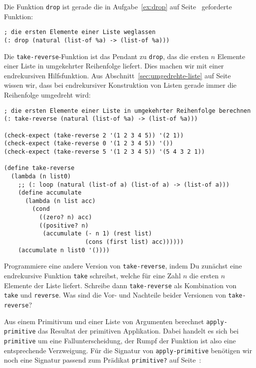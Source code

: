 %
Die Funktion \lstinline{drop} ist gerade die in
Aufgabe~\ref{ex:drop} auf Seite~\pageref{ex:drop} geforderte Funktion:
%
\begin{lstlisting}
; die ersten Elemente einer Liste weglassen
(: drop (natural (list-of %a) -> (list-of %a)))
\end{lstlisting}
%
Die \lstinline{take-reverse}-Funktion ist das Pendant zu
\lstinline{drop}, das die ersten $n$ Elemente einer Liste in
umgekehrter Reihenfolge liefert.  Dies machen wir mit einer
endrekursiven Hilfsfunktion.  Aus Abschnitt~\ref{sec:umgedrehte-liste}
auf Seite~\pageref{sec:umgedrehte-liste} wissen wir, dass bei
endrekursiver Konstruktion von Listen gerade immer die Reihenfolge
umgedreht wird:
%
\begin{lstlisting}
; die ersten Elemente einer Liste in umgekehrter Reihenfolge berechnen
(: take-reverse (natural (list-of %a) -> (list-of %a)))

(check-expect (take-reverse 2 '(1 2 3 4 5)) '(2 1))
(check-expect (take-reverse 0 '(1 2 3 4 5)) '())
(check-expect (take-reverse 5 '(1 2 3 4 5)) '(5 4 3 2 1))

(define take-reverse
  (lambda (n list0)
    ;; (: loop (natural (list-of a) (list-of a) -> (list-of a)))
    (define accumulate
      (lambda (n list acc)
        (cond
          ((zero? n) acc)
          ((positive? n)
           (accumulate (- n 1) (rest list)
                       (cons (first list) acc))))))
    (accumulate n list0 '())))
\end{lstlisting}
%
\begin{aufgabeinline}
  Programmiere eine andere Version von \lstinline{take-reverse}, indem
  Du zunächst eine endrekursive Funktion \lstinline{take} schreibst,
  welche für eine Zahl $n$ die ersten $n$ Elemente der Liste liefert.
  Schreibe dann \lstinline{take-reverse} als Kombination von
  \lstinline{take} und \lstinline{reverse}.  Was sind die Vor- und
  Nachteile beider Versionen von \lstinline{take-reverse}?
\end{aufgabeinline}
%
Aus einem Primitivum und einer Liste von Argumenten berechnet
\lstinline{apply-primitive} das Resultat der primitiven Applikation.
Dabei handelt es sich bei \lstinline{primitive} um eine
Fallunterscheidung, der Rumpf der Funktion ist also eine entsprechende
Verzweigung.  Für die Signatur von \lstinline{apply-primitive}
benötigen wir noch eine Signatur passend zum
Prädikat \lstinline{primitive?} auf Seite~\pageref{page:primitivep}:
%
